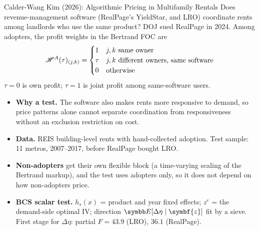 \documentclass[aspectratio=169,10pt]{beamer}
\begin{document}
\begin{frame}{Calder-Wang Kim (2026): Algorithmic Pricing in Multifamily Rentals}
\small
Does revenue-management software (RealPage's YieldStar, and LRO) coordinate rents among landlords who use the same product? DOJ sued RealPage in 2024. Among adopters, the profit weights in the Bertrand FOC are
\begin{align*}
\mathscr{H}^A(\tau)_{(j,k)} =
\begin{cases}
1 & j, k \text{ same owner}\\
\tau & j, k \text{ different owners, same software}\\
0 & \text{otherwise}
\end{cases}
\end{align*}
$\tau = 0$ is own profit; $\tau = 1$ is joint profit among same-software users.
\begin{itemize}
\item \textbf{Why a test.} The software also makes rents more responsive to demand, so price patterns alone cannot separate coordination from responsiveness without an exclusion restriction on cost.
\item \textbf{Data.} REIS building-level rents with hand-collected adoption. Test sample: 11 metros, 2007--2017, before RealPage bought LRO.
\item \textbf{Non-adopters} get their own flexible block (a time-varying scaling of the Bertrand markup), and the test uses adopters only, so it does not depend on how non-adopters price.
\item \textbf{BCS scalar test.} $h_s(x)$ = product and year fixed effects; $z^e$ = the demand-side optimal IV; direction $\E[\Delta\eta \mid \symbf{z}]$ fit by a sieve. First stage for $\Delta\eta$: partial $F = 43.9$ (LRO), $36.1$ (RealPage).
\end{itemize}
\end{frame}
\end{document}
